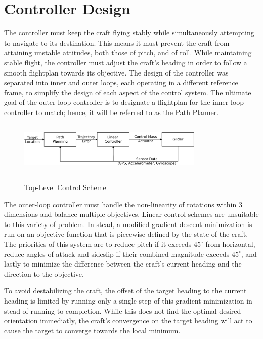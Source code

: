 \documentclass{sydeStyle}
\begin{document}
\section{Controller Design}

The controller must keep the craft flying stably while simultaneously attempting
to navigate to its destination.  This means it must prevent the craft from
attaining unstable attitudes, both those of pitch, and of roll.  While
maintaining stable flight, the controller must adjust the craft's heading in
order to follow a smooth flightplan towards its objective.  The design of the
controller was separated into inner and outer loops, each operating in a
different reference frame, to simplify the design of each aspect of the control
system.  The ultimate goal of the outer-loop controller is to designate a
flightplan for the inner-loop controller to match; hence, it will be referred to
as the Path Planner.

\begin{figure}[h!]
    \caption{Top-Level Control Scheme}
    \centering
    \includegraphics[height=1in,width=3.5in]{flowchart.eps}
    \label{fig:flowchart}
\end{figure}

The outer-loop controller must handle the non-linearity of rotations within 3
dimensions and balance multiple objectives. Linear control schemes are
unsuitable to this variety of problem. In stead, a modified gradient-descent minimization 
is run on an objective function that is piecewise defined by the state of the
craft. The priorities of this system are to reduce pitch if it exceeds
$45^{\circ}$ from horizontal, reduce angles of attack and sideslip if their
combined magnitude exceeds $45^{\circ}$, and lastly to minimize the difference
between the craft's current heading and the direction to the objective.

To avoid destabilizing the craft, the offset of the target heading to the
current heading is limited by running only a single step of this gradient
minimization in stead of running to completion. While this does not find the
optimal desired orientation immediatly, the craft's convergence on the target
heading will act to cause the target to converge towards the local minimum.
\end{document}
